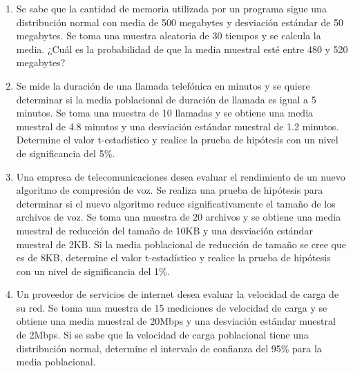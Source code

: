 \begin{Ejer}
\begin{enumerate}
\item Se sabe que la cantidad de memoria utilizada por un programa sigue una distribuci\'on normal con media de 500 megabytes y desviaci\'on est\'andar de 50 megabytes. Se toma una muestra aleatoria de 30 tiempos y se calcula la media. ¿Cu\'al es la probabilidad de que la media muestral est\'e entre 480 y 520 megabytes?

\item Se mide la duraci\'on de una llamada telef\'onica en minutos y se quiere determinar si la media poblacional de duraci\'on de llamada es igual a 5 minutos. Se toma una muestra de 10 llamadas y se obtiene una media muestral de 4.8 minutos y una desviaci\'on est\'andar muestral de 1.2 minutos. Determine el valor t-estad\'istico y realice la prueba de hip\'otesis con un nivel de significancia del 5\%.

\item Una empresa de telecomunicaciones desea evaluar el rendimiento de un nuevo algoritmo de compresi\'on de voz. Se realiza una prueba de hip\'otesis para determinar si el nuevo algoritmo reduce significativamente el tama\~no de los archivos de voz. Se toma una muestra de 20 archivos y se obtiene una media muestral de reducci\'on del tama\~no de 10KB y una desviaci\'on est\'andar muestral de 2KB. Si la media poblacional de reducci\'on de tama\~no se cree que es de 8KB, determine el valor t-estad\'istico y realice la prueba de hip\'otesis con un nivel de significancia del 1\%.

\item Un proveedor de servicios de internet desea evaluar la velocidad de carga de su red. Se toma una muestra de 15 mediciones de velocidad de carga y se obtiene una media muestral de 20Mbps y una desviaci\'on est\'andar muestral de 2Mbps. Si se sabe que la velocidad de carga poblacional tiene una distribuci\'on normal, determine el intervalo de confianza del 95\% para la media poblacional.

\end{enumerate}
\end{Ejer} 


